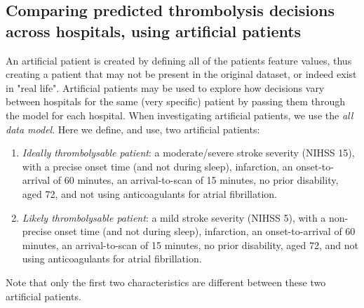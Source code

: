 
\subsection{Comparing predicted thrombolysis decisions across hospitals, using artificial patients}

An artificial patient is created by defining all of the patients feature values, thus creating a patient that may not be present in the original dataset, or indeed exist in "real life". Artificial patients may be used to explore how decisions vary between hospitals for the same (very specific) patient by passing them through the model for each hospital. When investigating artificial patients, we use the \emph{all data model}. Here we define, and use, two artificial patients: 
\begin{enumerate}
    \item \emph{Ideally thrombolysable patient}: a moderate/severe stroke severity (NIHSS 15), with a precise onset time (and not during sleep), infarction, an onset-to-arrival of 60 minutes, an arrival-to-scan of 15 minutes, no prior disability, aged 72, and not using anticoagulants for atrial fibrillation.
    \item \emph{Likely thrombolysable patient}: a mild stroke severity (NIHSS 5), with a non-precise onset time (and not during sleep), infarction, an onset-to-arrival of 60 minutes, an arrival-to-scan of 15 minutes, no prior disability, aged 72, and not using anticoagulants for atrial fibrillation. 
\end{enumerate}

Note that only the first two characteristics are different between these two artificial patients.